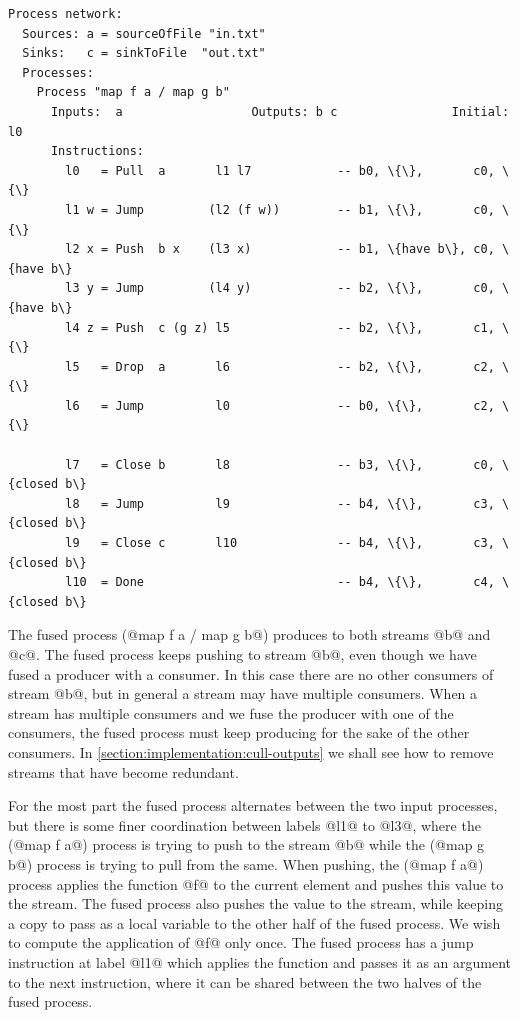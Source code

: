 \begin{lstlisting}[linebackgroundcolor={
  \hilineFst{8}
  \hilineCom{9}
  \hilineFst{10}
  \hilineSnd{11}
  \hilineSnd{12}
  \hilineFst{13}
  \hilineSnd{14}
  \hilineFst{16}
  \hilineSnd{17}
  \hilineSnd{18}
  \hilineCom{19}
}]
Process network:
  Sources: a = sourceOfFile "in.txt"
  Sinks:   c = sinkToFile  "out.txt"
  Processes:
    Process "map f a / map g b"
      Inputs:  a                  Outputs: b c                Initial: l0
      Instructions:
        l0   = Pull  a       l1 l7            -- b0, \{\},       c0, \{\}
        l1 w = Jump         (l2 (f w))        -- b1, \{\},       c0, \{\}
        l2 x = Push  b x    (l3 x)            -- b1, \{have b\}, c0, \{have b\}
        l3 y = Jump         (l4 y)            -- b2, \{\},       c0, \{have b\}
        l4 z = Push  c (g z) l5               -- b2, \{\},       c1, \{\}
        l5   = Drop  a       l6               -- b2, \{\},       c2, \{\}
        l6   = Jump          l0               -- b0, \{\},       c2, \{\}

        l7   = Close b       l8               -- b3, \{\},       c0, \{closed b\}
        l8   = Jump          l9               -- b4, \{\},       c3, \{closed b\}
        l9   = Close c       l10              -- b4, \{\},       c3, \{closed b\}
        l10  = Done                           -- b4, \{\},       c4, \{closed b\}
\end{lstlisting}

The fused process (@map f a / map g b@) produces to both streams @b@ and @c@.
The fused process keeps pushing to stream @b@, even though we have fused a producer with a consumer.
In this case there are no other consumers of stream @b@, but in general a stream may have multiple consumers.
When a stream has multiple consumers and we fuse the producer with one of the consumers, the fused process must keep producing for the sake of the other consumers.
In \autoref{section:implementation:cull-outputs} we shall see how to remove streams that have become redundant.

For the most part the fused process alternates between the two input processes, but there is some finer coordination between labels @l1@ to @l3@, where the (@map f a@) process is trying to push to the stream @b@ while the (@map g b@) process is trying to pull from the same.
When pushing, the (@map f a@) process applies the function @f@ to the current element and pushes this value to the stream.
The fused process also pushes the value to the stream, while keeping a copy to pass as a local variable to the other half of the fused process.
We wish to compute the application of @f@ only once.
The fused process has a jump instruction at label @l1@ which applies the function and passes it as an argument to the next instruction, where it can be shared between the two halves of the fused process.

